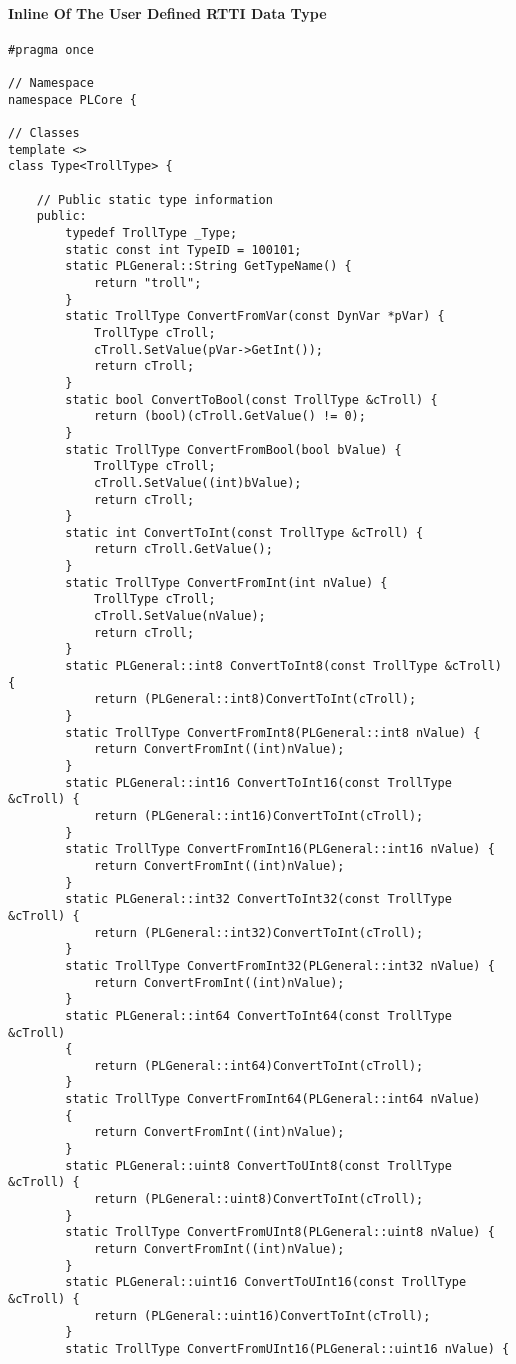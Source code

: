 \paragraph{Inline Of The User Defined RTTI Data Type}
\begin{lstlisting}[label=Code:UserDefinedRTTIDataTypeInline,caption={Inline of the user defined RTTI data type}]
#pragma once

// Namespace
namespace PLCore {

// Classes
template <>
class Type<TrollType> {

	// Public static type information
	public:
		typedef TrollType _Type;
		static const int TypeID = 100101;
		static PLGeneral::String GetTypeName() {
			return "troll";
		}
		static TrollType ConvertFromVar(const DynVar *pVar) {
			TrollType cTroll;
			cTroll.SetValue(pVar->GetInt());
			return cTroll;
		}
		static bool ConvertToBool(const TrollType &cTroll) {
			return (bool)(cTroll.GetValue() != 0);
		}
		static TrollType ConvertFromBool(bool bValue) {
			TrollType cTroll;
			cTroll.SetValue((int)bValue);
			return cTroll;
		}
		static int ConvertToInt(const TrollType &cTroll) {
			return cTroll.GetValue();
		}
		static TrollType ConvertFromInt(int nValue) {
			TrollType cTroll;
			cTroll.SetValue(nValue);
			return cTroll;
		}
		static PLGeneral::int8 ConvertToInt8(const TrollType &cTroll) {
			return (PLGeneral::int8)ConvertToInt(cTroll);
		}
		static TrollType ConvertFromInt8(PLGeneral::int8 nValue) {
			return ConvertFromInt((int)nValue);
		}
		static PLGeneral::int16 ConvertToInt16(const TrollType &cTroll) {
			return (PLGeneral::int16)ConvertToInt(cTroll);
		}
		static TrollType ConvertFromInt16(PLGeneral::int16 nValue) {
			return ConvertFromInt((int)nValue);
		}
		static PLGeneral::int32 ConvertToInt32(const TrollType &cTroll) {
			return (PLGeneral::int32)ConvertToInt(cTroll);
		}
		static TrollType ConvertFromInt32(PLGeneral::int32 nValue) {
			return ConvertFromInt((int)nValue);
		}
		static PLGeneral::int64 ConvertToInt64(const TrollType &cTroll)
		{
			return (PLGeneral::int64)ConvertToInt(cTroll);
		}
		static TrollType ConvertFromInt64(PLGeneral::int64 nValue)
		{
			return ConvertFromInt((int)nValue);
		}
		static PLGeneral::uint8 ConvertToUInt8(const TrollType &cTroll) {
			return (PLGeneral::uint8)ConvertToInt(cTroll);
		}
		static TrollType ConvertFromUInt8(PLGeneral::uint8 nValue) {
			return ConvertFromInt((int)nValue);
		}
		static PLGeneral::uint16 ConvertToUInt16(const TrollType &cTroll) {
			return (PLGeneral::uint16)ConvertToInt(cTroll);
		}
		static TrollType ConvertFromUInt16(PLGeneral::uint16 nValue) {

\end{lstlisting}
